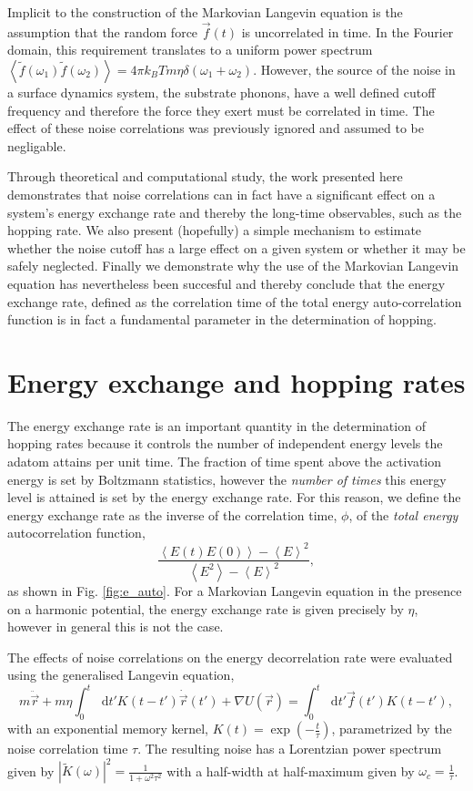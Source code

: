 \documentclass[7pt]{article}
\newcommand*{\diff}{\mathop{}\!\mathrm{d}}
\begin{document}
Implicit to the construction of the Markovian Langevin equation is the assumption that the random force $\vec{f}(t)$ is uncorrelated in time. In the Fourier domain, this requirement translates to a uniform power spectrum $\left<\tilde{f}(\omega_1)\tilde{f}(\omega_2)\right>=4\pi k_BTm\eta\delta(\omega_1+\omega_2)$. However, the source of the noise in a surface dynamics system, the substrate phonons, have a well defined cutoff frequency and therefore the force they exert must be correlated in time. The effect of these noise correlations was previously ignored and assumed to be negligable. 

Through theoretical and computational study, the work presented here demonstrates that noise correlations can in fact have a significant effect on a system's energy exchange rate and thereby the long-time observables, such as the hopping rate. We also present (hopefully) a simple mechanism to estimate whether the noise cutoff has a large effect on a given system or whether it may be safely neglected. Finally we demonstrate why the use of the Markovian Langevin equation has nevertheless been succesful and thereby conclude that the energy exchange rate, defined as the correlation time of the total energy auto-correlation function is in fact a fundamental parameter in the determination of hopping. 

\section*{Energy exchange and hopping rates}

The energy exchange rate is an important quantity in the determination of hopping rates because it controls the number of independent energy levels the adatom attains per unit time. The fraction of time spent above the activation energy is set by Boltzmann statistics, however the \emph{number of times} this energy level is attained is set by the energy exchange rate. For this reason, we define the energy exchange rate as the inverse of the correlation time, $\phi$, of the \emph{total energy} autocorrelation function, $$\frac{\left<E(t)E(0)\right> - \left<E\right>^2}{\left<E^2\right> - \left<E\right>^2},$$ as shown in Fig. \ref{fig:e_auto}. For a Markovian Langevin equation in the presence on a harmonic potential, the energy exchange rate is given precisely by $\eta$, however in general this is not the case.

The effects of noise correlations on the energy decorrelation rate were evaluated using the generalised Langevin equation,
\begin{equation}
	m\ddot{\vec{r}}+m\eta\int_0^t\diff{t'}K(t-t')\dot{\vec{r}}(t')+\nabla U(\vec{r})=\int_0^t\diff{t'}\vec{f}(t')K(t-t'),
	\label{eq:gle}
\end{equation}
with an exponential memory kernel, $K(t)=\exp(-\frac{t}{\tau})$, parametrized by the noise correlation time $\tau$. The resulting noise has a Lorentzian power spectrum given by $\left|\tilde{K}(\omega)\right|^2=\frac{1}{1+\omega^2\tau^2}$ with a half-width at half-maximum given by $\omega_c = \frac{1}{\tau}$.
\end{document}
